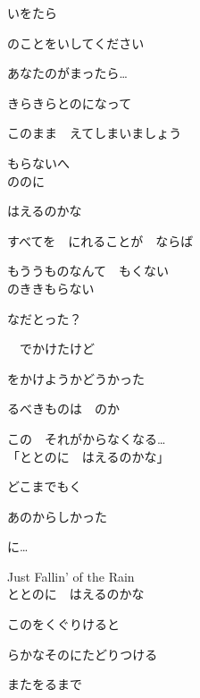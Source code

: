 \large{

いをたら

のことをいしてください

あなたのがまったら…

きらきらとのになって

このまま　えてしまいましょう　

もらないへ
\\

ののに　

はえるのかな

すべてを　にれることが　ならば

もううものなんて　もくない
\\

のききもらない　

なだとった？

　でかけたけど　

をかけようかどうかった

るべきものは　のか　

この　それがからなくなる…
\\

「ととのに　はえるのかな」

どこまでもく

あのからしかった　

に…　

Just Fallin' of the Rain
\\

ととのに　はえるのかな

このをくぐりけると

らかなそのにたどりつける

またをるまで

}
